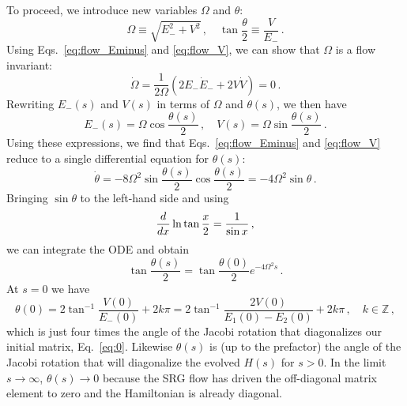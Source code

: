 To proceed, we introduce new variables $\Omega$ and $\theta$:
\begin{equation}
  \Omega \equiv \sqrt{E_{-}^2 + V^2}\,,\quad \tan\frac{\theta}{2} \equiv \frac{V}{E_{-}}\,.
\end{equation}
Using Eqs.~\eqref{eq:flow_Eminus} and \eqref{eq:flow_V}, we can show 
that $\Omega$ is a flow invariant:
\begin{equation}
  \dot\Omega = \frac{1}{2\Omega}(2 E_{-}\dot{E}_{-} + 2 V \dot{V}) = 0\,.
\end{equation}
Rewriting $E_{-}(s)$ and $V(s)$ in terms of $\Omega$ and $\theta(s)$,
we then have
\begin{equation}\label{eq:srg_toy_parameters}
  E_{-}(s) = \Omega \cos\frac{\theta(s)}{2}\,,\quad V(s) = \Omega \sin\frac{\theta(s)}{2}\,.
\end{equation}
Using these expressions, we find that Eqs.~\eqref{eq:flow_Eminus} and \eqref{eq:flow_V}
reduce to a single differential equation for $\theta(s)$:
\begin{equation}
  \dot\theta = - 8\Omega^2\sin\frac{\theta(s)}{2}\cos\frac{\theta(s)}{2} = -4\Omega^2\sin\theta\,.
\end{equation}
Bringing $\sin\theta$ to the left-hand side and using
\begin{equation}
   \frac{d {}} {d {x}} \ln\tan\frac{x}{2}=\frac{1}{\sin x}\,,
\end{equation}
we can integrate the ODE and obtain
\begin{equation}\label{eq:srg_toy_theta}
  \tan\frac{\theta(s)}{2} = \tan\frac{\theta(0)}{2} e^{-4\Omega^2 s}\,.
\end{equation}
At $s=0$ we have
\begin{equation}
  \theta(0) = 2 \tan^{-1} \frac{V(0)}{E_{-}(0)} + 2k\pi= 2 \tan^{-1}\frac{2 V(0)}{E_{1}(0) - E_{2}(0)}+2k\pi\,,
  \quad k \in \mathbb{Z}\,,
\end{equation}
which is just four times the angle of the Jacobi rotation that diagonalizes our initial
matrix, Eq.~\eqref{eq:0}. Likewise $\theta(s)$ is (up to the prefactor) the 
angle of the Jacobi rotation that will diagonalize the evolved $H(s)$ for $s>0$. In 
the limit $s\to\infty$,
$\theta(s)\to 0$ because the SRG flow has driven the off-diagonal matrix element to 
zero and the Hamiltonian is already diagonal.

